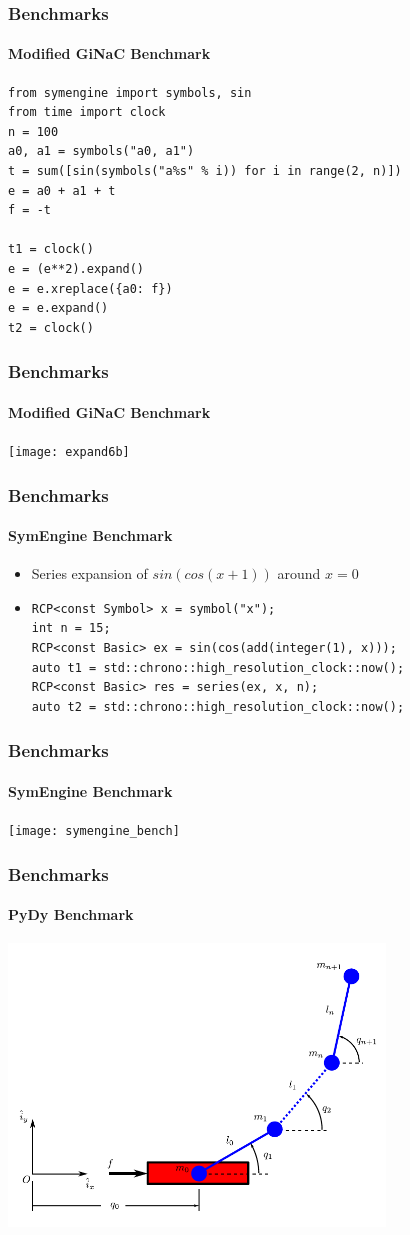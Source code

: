 \documentclass{beamer}
\begin{document}
\begin{frame}[fragile]
\frametitle{Benchmarks}
\framesubtitle{Modified GiNaC Benchmark}
\begin{verbatim}
from symengine import symbols, sin
from time import clock
n = 100
a0, a1 = symbols("a0, a1")
t = sum([sin(symbols("a%s" % i)) for i in range(2, n)])
e = a0 + a1 + t
f = -t

t1 = clock()
e = (e**2).expand()
e = e.xreplace({a0: f})
e = e.expand()
t2 = clock()
\end{verbatim}
\end{frame}

\begin{frame}
\frametitle{Benchmarks}
\framesubtitle{Modified GiNaC Benchmark}
\texttt{[image: expand6b]}
\end{frame}

\begin{frame}[fragile]
\frametitle{Benchmarks}
\framesubtitle{SymEngine Benchmark}
\begin{itemize}
\item Series expansion of $sin(cos(x+1))$ around $x=0$
\linebreak
\item
\begin{verbatim}
RCP<const Symbol> x = symbol("x");
int n = 15;
RCP<const Basic> ex = sin(cos(add(integer(1), x)));
auto t1 = std::chrono::high_resolution_clock::now();
RCP<const Basic> res = series(ex, x, n);
auto t2 = std::chrono::high_resolution_clock::now();
\end{verbatim}

\end{itemize}
\end{frame}

\begin{frame}
\frametitle{Benchmarks}
\framesubtitle{SymEngine Benchmark}
\texttt{[image: symengine\_bench]}
\end{frame}


\begin{frame}
\frametitle{Benchmarks}
\framesubtitle{PyDy Benchmark}
\includegraphics[width=10cm]{n-pendulum-with-cart}
\end{frame}
\end{document}
